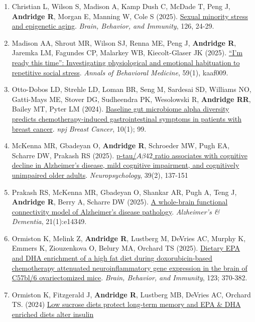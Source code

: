 \documentclass[
  english,
  letterpaper,
  DIV=11,
  numbers=noendperiod]{scrartcl}
\begin{document}
\begin{enumerate}
\item
  Christian L, Wilson S, Madison A, Kamp Dush C, McDade T, Peng J,
  \textbf{Andridge R}, Morgan E, Manning W, Cole S (2025).
  \href{https://doi.org/10.1016/j.bbi.2025.01.022}{Sexual minority
  stress and epigenetic aging}. \emph{Brain, Behavior, and Immunity},
  126, 24-29.
\item
  Madison AA, Shrout MR, Wilson SJ, Renna ME, Peng J, \textbf{Andridge
  R}, Jaremka LM, Fagundes CP, Malarkey WB, Kiecolt-Glaser JK (2025).
  \href{https://doi.org/10.1093/abm/kaaf009}{``I'm ready this time'':
  Investigating physiological and emotional habituation to repetitive
  social stress}. \emph{Annals of Behavioral Medicine}, 59(1), kaaf009.
\item
  Otto-Dobos LD, Strehle LD, Loman BR, Seng M, Sardesai SD, Williams NO,
  Gatti-Mays ME, Stover DG, Sudheendra PK, Wesolowski R,
  \textbf{Andridge RR}, Bailey MT, Pyter LM (2024).
  \href{https://doi.org/10.1038/s41523-024-00707-6}{Baseline gut
  microbiome alpha diversity predicts chemotherapy-induced
  gastrointestinal symptoms in patients with breast cancer}. \emph{npj
  Breast Cancer}, 10(1); 99.
\item
  McKenna MR, Gbadeyan O, \textbf{Andridge R}, Schroeder MW, Pugh EA,
  Scharre DW, Prakash RS (2025).
  \href{https://doi.org/10.1037/neu0000987}{p-tau/\(A \beta 42\) ratio
  associates with cognitive decline in Alzheimer's disease, mild
  cognitive impairment, and cognitively unimpaired older adults}.
  \emph{Neuropsychology}, 39(2), 137-151
\item
  Prakash RS, McKenna MR, Gbadeyan O, Shankar AR, Pugh A, Teng J,
  \textbf{Andridge R}, Berry A, Scharre DW (2025).
  \href{https://doi.org/10.1002/alz.14349}{A whole-brain functional
  connectivity model of Alzheimer's disease pathology}.
  \emph{Alzheimer's \& Dementia}, 21(1):e14349.
\item
  Ormiston K, Melink Z, \textbf{Andridge R}, Lustberg M, DeVries AC,
  Murphy K, Emmers K, Ziouzenkova O, Belury MA, Orchard TS (2025).
  \href{https://doi.org/10.1016/j.bbi.2024.09.021}{Dietary EPA and DHA
  enrichment of a high fat diet during doxorubicin-based chemotherapy
  attenuated neuroinflammatory gene expression in the brain of C57bl/6
  ovariectomized mice}. \emph{Brain, Behavior, and Immunity}, 123;
  370-382.
\item
  Ormiston K, Fitzgerald J, \textbf{Andridge R}, Lustberg MB, DeVries
  AC, Orchard TS. (2024)
  \href{https://doi.org/10.1016/j.nutres.2024.09.004}{Low sucrose diets
  protect long-term memory and EPA \& DHA enriched diets alter insulin
}
\end{enumerate}
\end{document}
